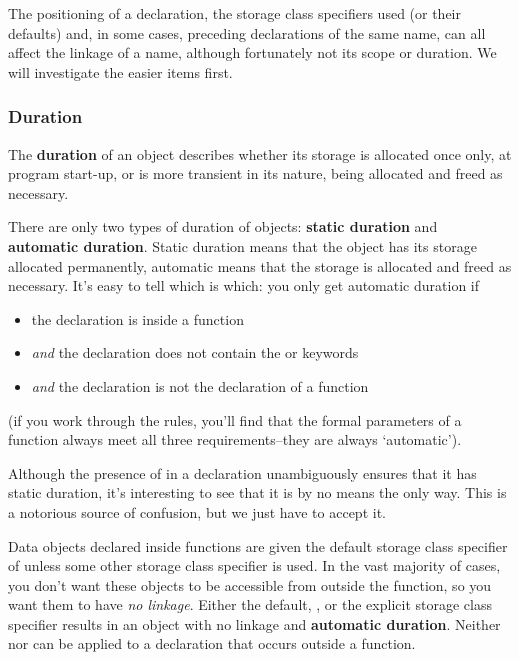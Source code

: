    The positioning of a declaration, the storage class specifiers used
    (or their defaults) and, in some cases, preceding declarations of the
    same name, can all affect the linkage of a name, although fortunately
    not its scope or duration. We will investigate the easier items
    first.


   \subsubsection{Duration}
    

    The \textbf{duration} of an object describes whether its storage is
     allocated once only, at program start-up, or is more transient in its
     nature, being allocated and freed as necessary.


    There are only two types of duration of objects: \textbf{static
     duration} and \textbf{automatic duration}. Static duration means
     that the object has its storage allocated permanently, automatic means
     that the storage is allocated and freed as necessary. It's easy to tell
     which is which: you only get automatic duration if


    \begin{itemize}
     \item the declaration is inside a function
     \item \textit{and} the declaration does not contain the
      \static{} or \extern{} keywords
     \item \textit{and} the declaration is not the declaration of a function
    \end{itemize}

    (if you work through the rules, you'll find that the formal
     parameters of a function always meet all three requirements--they
     are always `automatic').


    Although the presence of \static{} in a declaration
     unambiguously ensures that it has static duration, it's interesting to
     see that it is by no means the only way. This is a notorious source of
     confusion, but we just have to accept it.


    Data objects declared inside functions are given the default storage
     class specifier of \auto{} unless some other storage class
     specifier is used. In the vast majority of cases, you don't want these
     objects to be accessible from outside the function, so you want them to
     have \textit{no linkage}. Either the default, \auto, or the
     explicit \register{} storage class specifier results in an
     object with no linkage and \textbf{automatic duration}. Neither
     \auto{} nor \register{} can be applied to
     a declaration that occurs outside a function.


